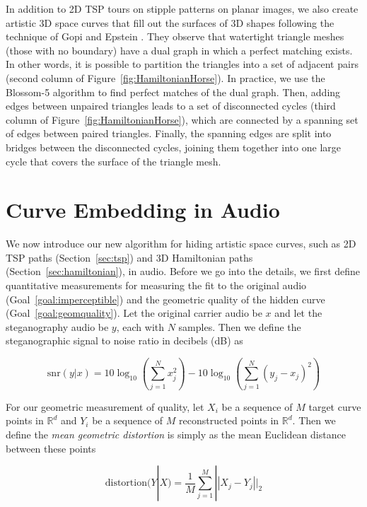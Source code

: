 \documentclass[runningheads]{llncs}
\begin{document}
In addition to 2D TSP tours on stipple patterns on planar images, we also create artistic 3D space curves that fill out the surfaces of 3D shapes following the technique of Gopi and Epstein \cite{gopi2004single}.  They observe that watertight triangle meshes (those with no boundary) have a dual graph in which a perfect matching exists.  In other words, it is possible to partition the triangles into a set of adjacent pairs (second column of Figure~\ref{fig:HamiltonianHorse}).  In practice, we use the Blossom-5 algorithm \cite{kolmogorov2009blossom} to find perfect matches of the dual graph.  Then, adding edges between unpaired triangles leads to a set of disconnected cycles (third column of Figure~\ref{fig:HamiltonianHorse}), which are connected by a spanning set of edges between paired triangles.  Finally, the spanning edges are split into bridges between the disconnected cycles, joining them together into one large cycle that covers the surface of the triangle mesh.


\section{Curve Embedding in Audio}

We now introduce our new algorithm for hiding artistic space curves, such as 2D TSP paths (Section~\ref{sec:tsp}) and 3D Hamiltonian paths (Section~\ref{sec:hamiltonian}), in audio.  Before we go into the details, we first define quantitative measurements for measuring the fit to the original audio (Goal~\ref{goal:imperceptible}) and the geometric quality of the hidden curve (Goal~\ref{goal:geomquality}).  Let the original carrier audio be $x$ and let the steganography audio be $y$, each with $N$ samples.  Then we define the steganographic signal to noise ratio in decibels (dB) as 

\begin{equation}
  \label{eq:stegsnr}
   \text{snr}(y|x) = 10  \log_{10} \left(\sum_{j=1}^N x_j^2 \right) -  10 \log_{10}\left(\sum_{j=1}^N (y_j-x_j)^2  \right)
\end{equation}

For our geometric measurement of quality, let $X_i$ be a sequence of $M$ target curve points in $\mathbb{R}^d$ and $Y_i$ be a sequence of $M$ reconstructed points in $\mathbb{R}^d$.  Then we define the {\em mean geometric distortion} is simply as the mean Euclidean distance between these points 

\begin{equation}
  \label{eq:distortion}
  \text{distortion}(Y|X) = \frac{1}{M} \sum_{j=1}^M ||X_j - Y_j||_2
\end{equation}
\end{document}
